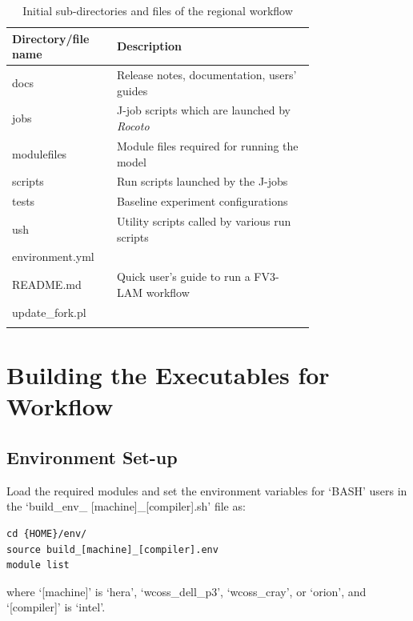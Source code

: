 \documentclass[11pt,fleqn]{report}              %
\begin{document}
{
\fontsize{10}{12}\selectfont
\begin{longtable}{ p{0.2\linewidth} | p{0.55\linewidth} }
\hline
\hline
 Directory/file name & Description \\
\hline
 docs & Release notes, documentation, users' guides  \\
 jobs & J-job scripts which are launched by {\it Rocoto} \\
 modulefiles & Module files required for running the model \\
 scripts & Run scripts launched by the J-jobs \\
 tests & Baseline experiment configurations \\
 ush & Utility scripts called by various run scripts\\
\hdashline
 environment.yml & \\
 README.md & Quick user's guide to run a FV3-LAM workflow \\
 update\_fork.pl & \\
\hline
\caption{Initial sub-directories and files of the regional workflow}
\label{table:workflow_dir}
\end{longtable}
}




\section{Building the Executables for Workflow}
\label{sec:build_exes_wflow}

\subsection{Environment Set-up}
\label{sec:build_env}

Load the required modules and set the environment variables for `BASH' users in the `build\_env\_ [machine]\_[compiler].sh' file as:
\lstset{language=bash}   
\begin{lstlisting}[frame=trBL]
cd {HOME}/env/
source build_[machine]_[compiler].env
module list
\end{lstlisting}
where `[machine]' is `hera', `wcoss\_dell\_p3', `wcoss\_cray', or `orion', and `[compiler]' is `intel'.

\vspace{0.5cm}
\end{document}
